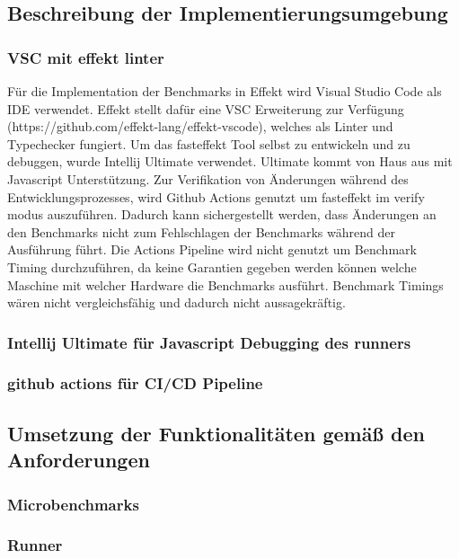 
\subsection{Beschreibung der Implementierungsumgebung}

\subsubsection{VSC mit effekt linter}

Für die Implementation der Benchmarks in Effekt wird Visual Studio Code als IDE verwendet.
Effekt stellt dafür eine VSC Erweiterung zur Verfügung (https://github.com/effekt-lang/effekt-vscode), welches als Linter und Typechecker fungiert. 
Um das fasteffekt Tool selbst zu entwickeln und zu debuggen, wurde Intellij Ultimate verwendet. Ultimate kommt von Haus aus mit Javascript Unterstützung.
Zur Verifikation von Änderungen während des Entwicklungsprozesses, wird Github Actions genutzt um fasteffekt im verify modus auszuführen. Dadurch kann sichergestellt werden, dass Änderungen an den Benchmarks nicht zum Fehlschlagen der Benchmarks während der Ausführung führt. Die Actions Pipeline wird nicht genutzt um Benchmark Timing durchzuführen, da keine Garantien gegeben werden können welche Maschine mit welcher Hardware die Benchmarks ausführt. Benchmark Timings wären nicht vergleichsfähig und dadurch nicht aussagekräftig.

\subsubsection{Intellij Ultimate für Javascript Debugging des runners}

\subsubsection{github actions für CI/CD Pipeline}

    
\subsection{Umsetzung der Funktionalitäten gemäß den Anforderungen} 
\subsubsection{ Microbenchmarks }
\subsubsection{ Runner }
